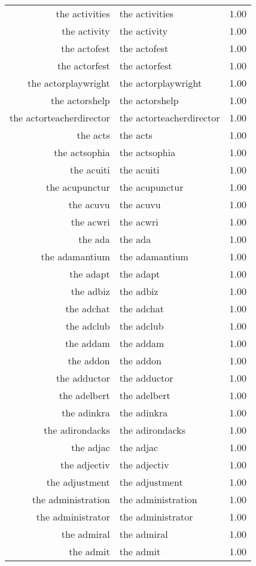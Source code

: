 \begin{table}[ht]
\begin{tabular}{rlr}
  the activities & the activities & 1.00 \\ 
  the activity & the activity & 1.00 \\ 
  the actofest & the actofest & 1.00 \\ 
  the actorfest & the actorfest & 1.00 \\ 
  the actorplaywright & the actorplaywright & 1.00 \\ 
  the actorshelp & the actorshelp & 1.00 \\ 
  the actorteacherdirector & the actorteacherdirector & 1.00 \\ 
  the acts & the acts & 1.00 \\ 
  the actsophia & the actsophia & 1.00 \\ 
  the acuiti & the acuiti & 1.00 \\ 
  the acupunctur & the acupunctur & 1.00 \\ 
  the acuvu & the acuvu & 1.00 \\ 
  the acwri & the acwri & 1.00 \\ 
  the ada & the ada & 1.00 \\ 
  the adamantium & the adamantium & 1.00 \\ 
  the adapt & the adapt & 1.00 \\ 
  the adbiz & the adbiz & 1.00 \\ 
  the adchat & the adchat & 1.00 \\ 
  the adclub & the adclub & 1.00 \\ 
  the addam & the addam & 1.00 \\ 
  the addon & the addon & 1.00 \\ 
  the adductor & the adductor & 1.00 \\ 
  the adelbert & the adelbert & 1.00 \\ 
  the adinkra & the adinkra & 1.00 \\ 
  the adirondacks & the adirondacks & 1.00 \\ 
  the adjac & the adjac & 1.00 \\ 
  the adjectiv & the adjectiv & 1.00 \\ 
  the adjustment & the adjustment & 1.00 \\ 
  the administration & the administration & 1.00 \\ 
  the administrator & the administrator & 1.00 \\ 
  the admiral & the admiral & 1.00 \\ 
  the admit & the admit & 1.00 \\ 

\end{tabular}
\end{table}
